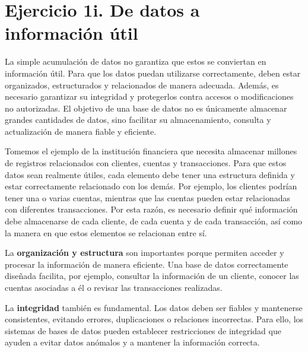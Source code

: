 
\section*{Ejercicio 1i. De datos a información útil}

\noindent

\vspace{0.3cm}

La simple acumulación de datos no garantiza que estos se conviertan en información útil. Para que los datos puedan utilizarse correctamente, deben estar organizados, estructurados y relacionados de manera adecuada. Además, es necesario garantizar su integridad y protegerlos contra accesos o modificaciones no autorizadas. El objetivo de una base de datos no es únicamente almacenar grandes cantidades de datos, sino facilitar su almacenamiento, consulta y actualización de manera fiable y eficiente.

\vspace{0.3cm}

Tomemos el ejemplo de la institución financiera que necesita almacenar millones de registros relacionados con clientes, cuentas y transacciones. Para que estos datos sean realmente útiles, cada elemento debe tener una estructura definida y estar correctamente relacionado con los demás. Por ejemplo, los clientes podrían tener una o varias cuentas, mientras que las cuentas pueden estar relacionadas con diferentes transacciones. Por esta razón, es necesario definir qué información debe almacenarse de cada cliente, de cada cuenta y de cada transacción, así como la manera en que estos elementos se relacionan entre sí.

\vspace{0.3cm}

La \textbf{organización y estructura} son importantes porque permiten acceder y procesar la información de manera eficiente. Una base de datos correctamente diseñada facilita, por ejemplo, consultar la información de un cliente, conocer las cuentas asociadas a él o revisar las transacciones realizadas.

\vspace{0.2cm}

La \textbf{integridad} también es fundamental. Los datos deben ser fiables y mantenerse consistentes, evitando errores, duplicaciones o relaciones incorrectas. Para ello, los sistemas de bases de datos pueden establecer restricciones de integridad que ayuden a evitar datos anómalos y a mantener la información correcta.

